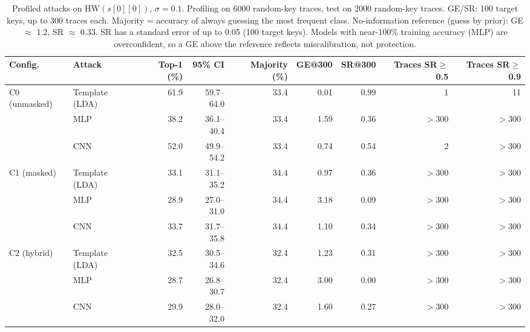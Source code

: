 \begin{table}[t]\centering
\caption{Profiled attacks on $\mathrm{HW}(s[0][0])$, $\sigma=0.1$. Profiling on 6000 random-key traces, test on 2000 random-key traces. GE/SR: 100 target keys, up to 300 traces each. Majority = accuracy of always guessing the most frequent class. No-information reference (guess by prior): GE $\approx$ 1.2, SR $\approx$ 0.33. SR has a standard error of up to 0.05 (100 target keys). Models with near-100\% training accuracy (MLP) are overconfident, so a GE above the reference reflects miscalibration, not protection.}
\label{tab:attack_s01}
\begin{tabular}{llrrrrrrr}\toprule
Config. & Attack & Top-1 (\%) & 95\% CI & Majority (\%) & GE@300 & SR@300 & Traces SR$\geq$0.5 & Traces SR$\geq$0.9\\\midrule
C0 (unmasked) & Template (LDA) & 61.9 & 59.7--64.0 & 33.4 & 0.01 & 0.99 & 1 & 11\\
 & MLP & 38.2 & 36.1--40.4 & 33.4 & 1.59 & 0.36 & $>$300 & $>$300\\
 & CNN & 52.0 & 49.9--54.2 & 33.4 & 0.74 & 0.54 & 2 & $>$300\\
C1 (masked) & Template (LDA) & 33.1 & 31.1--35.2 & 34.4 & 0.97 & 0.36 & $>$300 & $>$300\\
 & MLP & 28.9 & 27.0--31.0 & 34.4 & 3.18 & 0.09 & $>$300 & $>$300\\
 & CNN & 33.7 & 31.7--35.8 & 34.4 & 1.10 & 0.34 & $>$300 & $>$300\\
C2 (hybrid) & Template (LDA) & 32.5 & 30.5--34.6 & 32.4 & 1.23 & 0.31 & $>$300 & $>$300\\
 & MLP & 28.7 & 26.8--30.7 & 32.4 & 3.00 & 0.00 & $>$300 & $>$300\\
 & CNN & 29.9 & 28.0--32.0 & 32.4 & 1.60 & 0.27 & $>$300 & $>$300\\
\bottomrule\end{tabular}\end{table}
